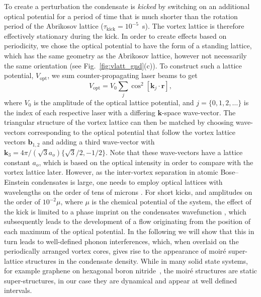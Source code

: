 To create a perturbation the condensate is {\it kicked} by switching on an additional optical potential for a period of time that is much shorter than the rotation period of the Abrikosov lattice ($\tau_{\text{kick}}=10^{-5}$~s). The vortex lattice is therefore effectively stationary during the kick. In order to create effects based on periodicity, we chose the optical potential to have the form of a standing lattice, which has the same geometry as the Abrikosov lattice, however not necessarily the same orientation (see Fig.~\ref{fig:vlatt_gnd}(c)). To construct such a lattice potential, $V_{\text{opt}}$, we sum counter-propagating laser beams to get
	\begin{equation}
		V_\text{opt} = V_0\displaystyle\sum_{j}\cos^2 \left[ \textbf{k}_{j}\cdot\textbf{r} \right],
	\end{equation}
	where $V_0$ is the amplitude of the optical lattice potential, and $j=\lbrace 0,1,2,\ldots \rbrace$ is the index of each respective laser with a differing $\mathbf{k}$-space wave-vector. The triangular structure of the vortex lattice can then be matched by choosing wave-vectors corresponding to the optical potential that follow the vortex lattice vectors $\mathbf{b}_{1,2}$ and adding a third wave-vector with $\mathbf{k}_3 = 4\pi/(\sqrt{3}a_o)\{\sqrt{3}/2,-1/2\}$. Note that these wave-vectors have a lattice constant $a_o$, which is based on the optical intensity in order to compare with the vortex lattice later.
 However, as the inter-vortex separation in atomic Bose--Einstein condensates is large, one needs to employ optical lattices with wavelengths on the order of tens of microns \cite{BEC:Fallani_optexp_2005,BEC:Williams_optexp_2008}.
For short kicks, and amplitudes on the order of $10^{-2} \mu $, where $\mu$ is the chemical potential of the system, the effect of the kick is limited to a phase imprint on the condensates wavefunction \cite{Vtx:Dobrek_pra_1999}, which subsequently leads to the development of a flow originating from the position of each maximum of the optical potential. In the following we will show that this in turn leads to well-defined phonon interferences, which, when overlaid on the periodically arranged vortex cores,  gives rise to the appearance of moir\'e super-lattice structures \cite{mor:murata_acsn_2010} in the condensate density. While in many solid state systems, for example graphene on hexagonal boron nitride~\cite{nphys2272}, the moir\'e structures are static super-structures, in our case they are dynamical and appear at well defined intervals.


